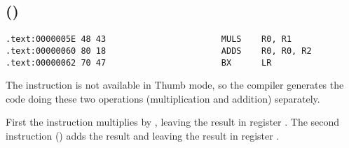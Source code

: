 \subsection{\OptimizingKeilVI (\ThumbMode)}

\begin{lstlisting}[label=ARM_leaf_example2]
.text:0000005E 48 43                       MULS    R0, R1
.text:00000060 80 18                       ADDS    R0, R0, R2
.text:00000062 70 47                       BX      LR
\end{lstlisting}

The  instruction is not available in Thumb mode, so the compiler generates the code doing these two 
operations (multiplication and addition) separately.

First the  instruction multiplies  by , leaving the result in register .
The second instruction () adds the result and  leaving the result in register .

